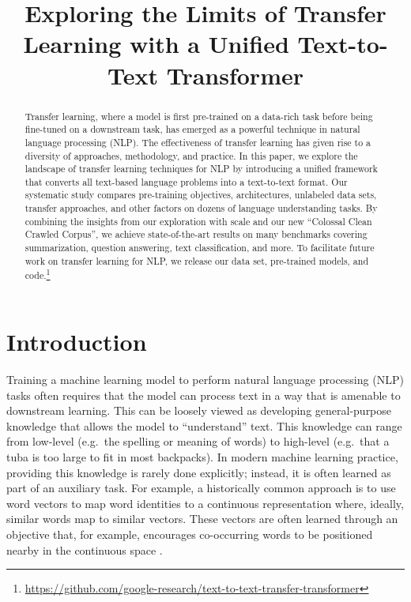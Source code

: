 \title{Exploring the Limits of Transfer Learning with a Unified Text-to-Text Transformer}

\begin{abstract}
Transfer learning, where a model is first pre-trained on a data-rich task before being fine-tuned on a downstream task, has emerged as a powerful technique in natural language processing (NLP). The effectiveness of transfer learning has given rise to a diversity of approaches, methodology, and practice. In this paper, we explore the landscape of transfer learning techniques for NLP by introducing a unified framework that converts all text-based language problems into a text-to-text format. Our systematic study compares pre-training objectives, architectures, unlabeled data sets, transfer approaches, and other factors on dozens of language understanding tasks. By combining the insights from our exploration with scale and our new ``Colossal Clean Crawled Corpus'', we achieve state-of-the-art results on many benchmarks covering summarization, question answering, text classification, and more. To facilitate future work on transfer learning for NLP, we release our data set, pre-trained models, and code.\footnote{\label{fn:oss}\url{https://github.com/google-research/text-to-text-transfer-transformer}}
\end{abstract}

\section{Introduction}

Training a machine learning model to perform natural language processing (NLP) tasks often requires that the model can process text in a way that is amenable to downstream learning. This can be loosely viewed as developing general-purpose knowledge that allows the model to ``understand'' text. This knowledge can range from low-level (e.g.\ the spelling or meaning of words) to high-level (e.g.\ that a tuba is too large to fit in most backpacks). In modern machine learning practice, providing this knowledge is rarely done explicitly; instead, it is often learned as part of an auxiliary task. For example, a historically common approach is to use word vectors \citep{mikolov2013distributed,mikolov2013efficient,pennington2014glove} to map word identities to a continuous representation where, ideally, similar words map to similar vectors. These vectors are often learned through an objective that, for example, encourages co-occurring words to be positioned nearby in the continuous space \citep{mikolov2013distributed}.

